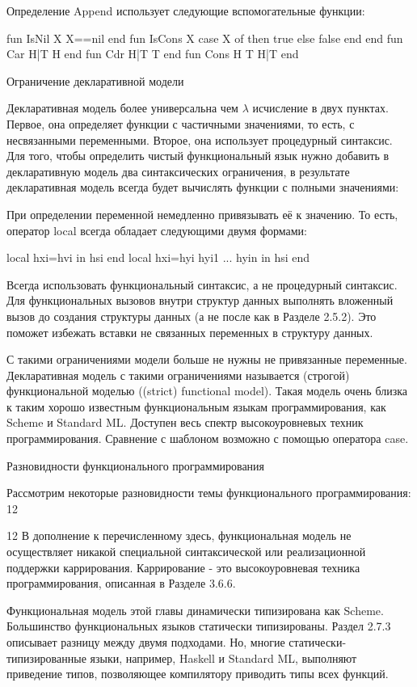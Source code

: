 Определение Append использует следующие вспомогательные функции:

fun
{IsNil X} X==nil end
fun
{IsCons X} case X of  then true else false end end
fun
{Car H|T} H end
fun
{Cdr H|T} T end
fun
{Cons H T} H|T end

Ограничение декларативной модели

Декларативная модель более универсальна чем $\lambda$ исчисление в двух пунктах. Первое, она определяет функции с частичными значениями, то есть, с несвязанными переменными. Второе, она использует процедурный синтаксис. Для того, чтобы определить чистый функциональный язык нужно добавить в декларативную модель два синтаксических ограничения, в результате декларативная модель всегда будет вычислять функции с полными значениями:

При определении переменной немедленно привязывать её к значению. То есть, оператор local всегда обладает следующими двумя формами:

local hxi=hvi in hsi end
local hxi={hyi hyi1 ... hyin } in hsi end

Всегда использовать функциональный синтаксис, а не процедурный синтаксис. Для функциональных вызовов внутри структур данных выполнять вложенный вызов до создания структуры данных (а не после как в Разделе 2.5.2). Это поможет избежать вставки не связанных переменных в структуру данных.

С такими ограничениями модели больше не нужны не привязанные переменные. Декларативная модель с такими ограничениями называется (строгой) функциональной моделью ((strict) functional model). Такая модель очень близка к таким хорошо известным функциональным языкам программирования, как Scheme и Standard ML. Доступен весь спектр высокоуровневых техник программирования. Сравнение с шаблоном возможно с помощью оператора case.

Разновидности функционального программирования

Рассмотрим некоторые разновидности темы функционального программирования: 12

12 В дополнение к перечисленному здесь, функциональная модель не осуществляет никакой специальной синтаксической или реализационной поддержки каррирования. Каррирование - это высокоуровневая техника программирования, описанная в Разделе 3.6.6.

Функциональная модель этой главы динамически типизирована как Scheme. Большинство функциональных языков статически типизированы. Раздел 2.7.3 описывает разницу между двумя подходами. Но, многие статически-типизированные языки, например, Haskell и Standard ML, выполняют приведение типов, позволяющее компилятору приводить типы всех функций.

